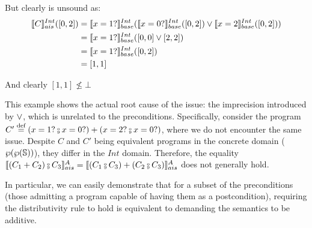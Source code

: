 \documentclass[
  10pt,       %
  twoside,    %
  a4paper,    %
  english,    %
  tikz,       %
  openright,  %
]{book}
\begin{document}
\begin{example}
  But clearly is unsound as:
  \begin{align*}
    \asem[Int]{C}([0, 2]) &= \bsem{x = 1?}^{Int}(\bsem{x = 0?}^{Int}([0, 2]) 
      \join \bsem{x = 2}^{Int}([0, 2])) \\
                          &= \bsem{x = 1?}^{Int}([0, 0] \join [2, 2]) \\
                          &= \bsem{x = 1?}^{Int}([0, 2]) \\
                          &= [1, 1]
  \end{align*}

  And clearly $[1, 1] \not \leq \bot$
\end{example}

This example shows the actual root cause of the issue: the imprecision
introduced by $\join$, which is unrelated to the preconditions. Specifically,
consider the program $C' \defeq (x = 1? \fcmp x = 0?) + (x = 2? \fcmp x = 0?)$,
where we do not encounter the same issue. Despite $C$ and $C'$ being equivalent
programs in the concrete domain ($\pow{\pow{\states}}$), they differ in the
$Int$ domain. Therefore, the equality $\asem{(C_1 + C_2) \fcmp C_3} =
\asem{(C_1 \fcmp C_3) + (C_2 \fcmp C_3)}$ does not generally hold.

In particular, we can easily demonstrate that for a subset of the preconditions
(those admitting a program capable of having them as a postcondition), requiring 
the distributivity rule to hold is equivalent to demanding the semantics to be
additive.
\end{document}
